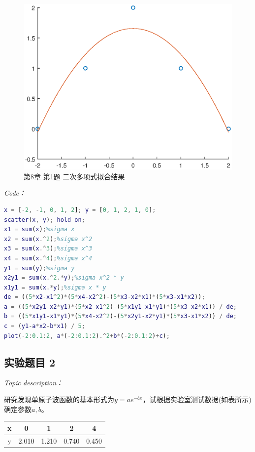 \documentclass[12pt]{ctexart}
\begin{document}
	\begin{figure}[htbp]
		\centering
		\includegraphics[scale=0.7]{e8_1.eps}
		\caption{第8章 第1题 二次多项式拟合结果}
	\end{figure}
	
	\textit{Code：}
	
\begin{lstlisting}[language = MATLAB]
% 第8章 第1题
x = [-2, -1, 0, 1, 2]; y = [0, 1, 2, 1, 0];
scatter(x, y); hold on;
x1 = sum(x);%sigma x
x2 = sum(x.^2);%sigma x^2
x3 = sum(x.^3);%sigma x^3
x4 = sum(x.^4);%sigma x^4
y1 = sum(y);%sigma y
x2y1 = sum(x.^2.*y);%sigma x^2 * y
x1y1 = sum(x.*y);%sigma x * y
de = ((5*x2-x1^2)*(5*x4-x2^2)-(5*x3-x2*x1)*(5*x3-x1*x2));
a = ((5*x2y1-x2*y1)*(5*x2-x1^2)-(5*x1y1-x1*y1)*(5*x3-x2*x1)) / de;
b = ((5*x1y1-x1*y1)*(5*x4-x2^2)-(5*x2y1-x2*y1)*(5*x3-x1*x2)) / de;
c = (y1-a*x2-b*x1) / 5;
plot(-2:0.1:2, a*(-2:0.1:2).^2+b*(-2:0.1:2)+c);
\end{lstlisting}

	\subsection{实验题目 2}
	\textit{Topic description：}
	
	研究发现单原子波函数的基本形式为$y=ae^{-bx}$，试根据实验室测试数据(如表所示)确定参数$a,b$。
	\begin{table}[htbp]
		\centering
		\begin{tabular}
			{c|cccc}
			\hline
			x&0&1&2&4 \\
			\hline
			y&2.010&1.210&0.740&0.450 \\
			\hline
		\end{tabular}
	\end{table}
\end{document}
